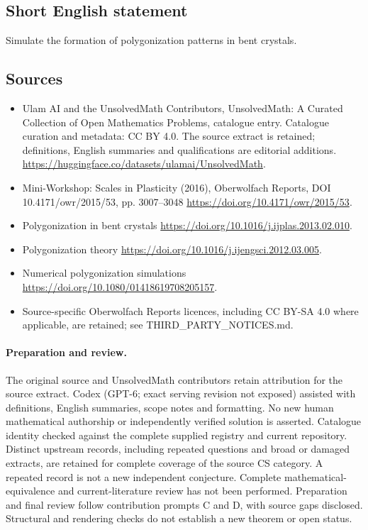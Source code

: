 \documentclass[11pt]{article}
\begin{document}
\subsection{Short English statement}
Simulate the formation of polygonization patterns in bent crystals.
\subsection{Sources}
\begin{itemize}
\item[\hypertarget{source:statement:1}{S1}] Ulam AI and the UnsolvedMath Contributors, UnsolvedMath: A Curated Collection of Open Mathematics Problems, catalogue entry. Catalogue curation and metadata: CC BY 4.0. The source extract is retained; definitions, English summaries and qualifications are editorial additions.
\url{https://huggingface.co/datasets/ulamai/UnsolvedMath}.
\item[\hypertarget{source:statement:2}{S2}] Mini-Workshop: Scales in Plasticity (2016), Oberwolfach Reports, DOI 10.4171/owr/2015/53, pp. 3007--3048
\url{https://doi.org/10.4171/owr/2015/53}.
\item[\hypertarget{source:statement:3}{S3}] Polygonization in bent crystals
\url{https://doi.org/10.1016/j.ijplas.2013.02.010}.
\item[\hypertarget{source:statement:4}{S4}] Polygonization theory
\url{https://doi.org/10.1016/j.ijengsci.2012.03.005}.
\item[\hypertarget{source:statement:5}{S5}] Numerical polygonization simulations
\url{https://doi.org/10.1080/01418619708205157}.
\item Source-specific Oberwolfach Reports licences, including CC BY-SA 4.0 where applicable, are retained; see THIRD\_PARTY\_NOTICES.md.
\end{itemize}
\paragraph{Preparation and review.}
The original source and UnsolvedMath contributors retain attribution for the source extract. Codex (GPT-6; exact serving revision not exposed) assisted with definitions, English summaries, scope notes and formatting. No new human mathematical authorship or independently verified solution is asserted. Catalogue identity checked against the complete supplied registry and current repository. Distinct upstream records, including repeated questions and broad or damaged extracts, are retained for complete coverage of the source CS category. A repeated record is not a new independent conjecture. Complete mathematical-equivalence and current-literature review has not been performed. Preparation and final review follow contribution prompts C and D, with source gaps disclosed. Structural and rendering checks do not establish a new theorem or open status.
\label{end:statement}
\end{document}
